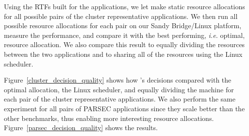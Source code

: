 Using the RTFs built for the applications, we let \pacora make static resource allocations for all possible pairs of the cluster representative applications.  We then run all possible resource allocations for each pair on our Sandy Bridge/Linux platform, measure the performance, and compare it with the best performing, \emph{i.e.} optimal, resource allocation.  We also compare this result to equally dividing the resources between the two applications and to sharing all of the resources using the Linux scheduler.


Figure~\ref{cluster_decision_quality} shows how \pacora's decisions compared with the optimal allocation, the Linux scheduler, and equally dividing the machine for each pair of the cluster representative applications.  We also perform the same experiment for all pairs of PARSEC applications since they scale better than the other benchmarks, thus enabling more interesting resource allocations.  Figure~\ref{parsec_decision_quality} shows the results.
